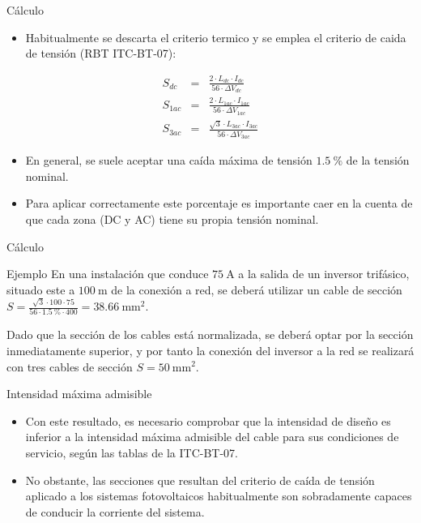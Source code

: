 \documentclass[xcolor={usenames,svgnames,dvipsnames}]{beamer}
\begin{document}
\begin{frame}[label=sec-3-0-2]{Cálculo}
\begin{itemize}
\item Habitualmente se descarta el criterio termico y se emplea el criterio de caida de tensión (RBT ITC-BT-07):
\end{itemize}

$$\begin{aligned}
    S_{dc} & = & \frac{2\cdot L_{dc}\cdot I_{dc}}{56\cdot\Delta V_{dc}}\\
    S_{1ac} & = & \frac{2\cdot L_{1ac}\cdot I_{1ac}}{56\cdot\Delta V_{1ac}}\\
    S_{3ac} & = & \frac{\sqrt{3}\cdot L_{3ac}\cdot
      I_{3ac}}{56\cdot\Delta V_{3ac}}\end{aligned}$$

\begin{itemize}
\item En general, se suele aceptar una caída máxima de tensión $\SI{1.5}{\percent}$ de la tensión nominal.

\item Para aplicar correctamente este porcentaje es importante caer en la cuenta de que \alert{cada zona (DC y AC) tiene su propia tensión nominal}.
\end{itemize}
\end{frame}

\begin{frame}[label=sec-3-0-3]{Cálculo}
\begin{block}{Ejemplo}
En una instalación que conduce $\SI{75}{\ampere}$ a la salida de un inversor trifásico, situado este a $\SI{100}{\meter}$ de la
conexión a red, se deberá utilizar un cable de sección $S=\frac{\sqrt{3}\cdot100\cdot75}{56\cdot\SI{1.5}{\percent}\cdot400}=\SI{38.66}{\milli\meter\squared}$.

Dado que la sección de los cables está normalizada, se deberá optar por la sección inmediatamente superior, y por tanto la conexión del inversor a la red se realizará con tres cables de sección $S=\SI{50}{\milli\meter\squared}$.
\end{block}
\end{frame}

\begin{frame}[label=sec-3-0-4]{Intensidad máxima admisible}
\begin{itemize}
\item Con este resultado, es necesario comprobar que la intensidad de diseño es inferior a la intensidad máxima admisible del cable para sus condiciones de servicio, según las tablas de la ITC-BT-07.

\item No obstante, las secciones que resultan del criterio de caída de tensión aplicado a los sistemas fotovoltaicos habitualmente son sobradamente capaces de conducir la corriente del sistema.
\end{itemize}
\end{frame}
\end{document}
